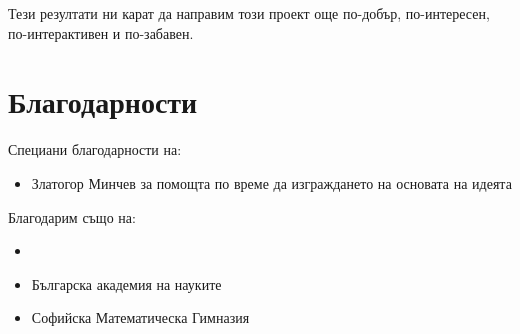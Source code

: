 \documentclass[a4paper, 12pt]{article}
\begin{document}
	Тези резултати ни карат да направим този проект още по-добър, по-интересен, по-интерактивен и по-забавен.
 	\section{Благодарности}
 	 	 Специани благодарности на:
 	 	 \begin{itemize}
 	 	 	\item Златогор Минчев за помощта по време да изграждането на основата на идеята
 	 	 \end{itemize}
 	 	 Благодарим също на:
 	 	 \begin{itemize}
 	 	 	\item 
 	 	 	\item Българска академия на науките
 	 	 	\item Софийска Математическа Гимназия
 	 	 \end{itemize}
\end{document}
